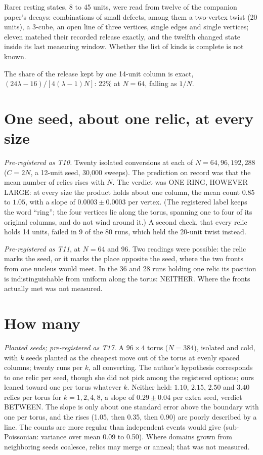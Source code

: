 \documentclass[aps,pre,10pt,twocolumn,superscriptaddress,nofootinbib]{revtex4-2}
\begin{document}
Rarer resting states, 8 to 45 units, were read from twelve of the companion paper's decays: combinations of
small defects, among them a two-vertex twist (20 units), a 3-cube, an open line of three vertices, single edges
and single vertices; eleven matched their recorded release exactly, and the twelfth changed state inside its
last measuring window. Whether the list of
kinds is complete is not known.

The share of the release kept by one 14-unit column is exact, $(24\lambda - 16)/[4(\lambda - 1)N]$: 22\% at
$N = 64$, falling as $1/N$.

\section{One seed, about one relic, at every size}
\label{sec:one}

\emph{Pre-registered as T10.} Twenty isolated conversions at each of $N = 64, 96, 192, 288$ ($C = 2N$, a
12-unit seed, 30,000 sweeps). The prediction on record was that the mean number of relics rises with $N$. The
verdict was ONE RING, HOWEVER LARGE: at every size the product holds about one column, the mean count $0.85$
to $1.05$, with a slope of $0.0003 \pm 0.0003$ per vertex. (The registered label keeps the word ``ring''; the
four vertices lie along the torus, spanning one to four of its original columns, and do not wind around it.) A second check, that every
relic holds 14 units, failed in 9 of the 80 runs, which held the 20-unit twist instead.

\emph{Pre-registered as T11}, at $N = 64$ and 96. Two readings were possible: the relic marks the seed, or it
marks the place opposite the seed, where the two fronts from one nucleus would meet. In the 36 and 28 runs
holding one relic its position is indistinguishable from uniform along the torus: NEITHER. Where the fronts
actually met was not measured.

\section{How many}
\label{sec:count}

\emph{Planted seeds; pre-registered as T17.} A $96 \times 4$ torus ($N = 384$), isolated and cold, with $k$
seeds planted as the cheapest move out of the torus at evenly spaced columns; twenty runs per $k$, all
converting. The author's hypothesis corresponds to one relic per seed, though she did not pick among the
registered options; ours leaned toward one per torus whatever $k$. Neither held: $1.10$, $2.15$, $2.50$ and
$3.40$ relics per torus for $k = 1, 2, 4, 8$, a slope of $0.29 \pm 0.04$ per extra seed, verdict BETWEEN. The
slope is only about one standard error above the boundary with one per torus, and the rises (1.05, then 0.35,
then 0.90) are poorly described by a line. The counts are more regular than independent events would give
(sub-Poissonian: variance over mean 0.09 to 0.50). Where domains grown from neighboring seeds coalesce, relics
may merge or anneal; that was not measured.
\end{document}
